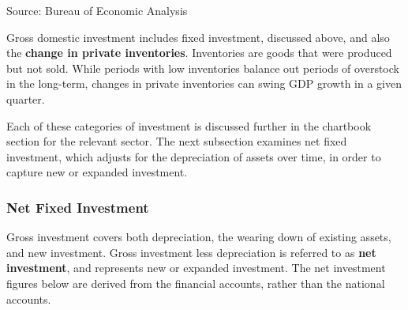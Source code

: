 \documentclass{report}
\newcommand{\tbllink}[1]{\href{https://raw.githubusercontent.com/bdecon/US-chartbook/master/chartbook/data/#1}{\faTable}}
\begin{document}
{\begin{minipage}{0.76\textwidth}
\footnotesize{Source: Bureau of Economic Analysis} \hfill \tbllink{inv.csv} 
\vspace{1.5mm}

\small Gross domestic investment includes fixed investment, discussed above, and also the \textbf{change in private inventories}. Inventories are goods that were produced but not sold. While periods with low inventories balance out periods of overstock in the long-term, changes in private inventories can swing GDP growth in a given quarter. 

 

Each of these categories of investment is discussed further in the chartbook section for the relevant sector. The next subsection examines net fixed investment, which adjusts for the depreciation of assets over time, in order to capture new or expanded investment. 
\end{minipage}
\newpage
\vspace*{-9mm}

\begin{minipage}{0.76\textwidth}   
\subsubsection*{Net Fixed Investment}
\vspace{-1mm}
\small Gross investment covers both depreciation, the wearing down of existing assets, and new investment. Gross investment less depreciation is referred to as \textbf{net investment}, and represents new or expanded investment. The net investment figures below are derived from the financial accounts, rather than the national accounts. 


\end{minipage}}
\end{document}
